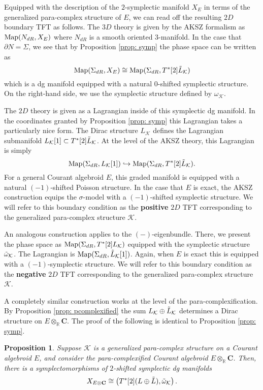 \documentclass[letterpaper,12pt]{article}
\newcommand{\KK}{\mathcal{K}}
\newcommand{\Cc}{\mathbf{C}}
\newcommand{\RR}{\mathbb{R}}
\newtheorem{proposition}[theorem]{Proposition}
\theoremstyle{definition}
\theoremstyle{remark}
\theoremstyle{examples}
\begin{document}
Equipped with the description of the $2$-symplectic manifold $X_E$ in terms of the generalized para-complex structure of $E$, we can read off the resulting $2D$ boundary TFT as follows.
The $3D$ theory is given by the AKSZ formalism as ${\rm Map}(N_{dR}, X_E)$ where $N_{dR}$ is a smooth oriented $3$-manifold.
In the case that $\partial N = \Sigma$, we see that by Proposition \ref{prop: symp} the phase space can be written as
\[
{\rm Map}(\Sigma_{dR} , X_E) \cong {\rm Map}(\Sigma_{dR}, T^*[2] \Tilde{L}_{\KK}) 
\]
which is a dg manifold equipped with a natural $0$-shifted symplectic structure.
On the right-hand side, we use the symplectic structure defined by $\omega_{\KK}$. 

The $2D$ theory is given as a Lagrangian inside of this symplectic dg manifold. 
In the coordinates granted by Proposition \ref{prop: symp} this Lagrangian takes a particularly nice form.
The Dirac structure $L_\KK$ defines the Lagrangian submanifold $L_\KK[1] \subset T^*[2] \Tilde{L}_{\KK}$. 
At the level of the AKSZ theory, this Lagrangian is simply
\[
{\rm Map}(\Sigma_{dR}, L_{\KK} [1])  \hookrightarrow {\rm Map}(\Sigma_{dR} , T^*[2] \Tilde{L}_{\KK}) .
\]
For a general Courant algebroid $E$, this graded manifold is equipped with a natural $(-1)$-shifted Poisson structure. 
In the case that $E$ is exact, the AKSZ construction equips the $\sigma$-model with a $(-1)$-shifted symplectic structure. 
We will refer to this boundary condition as the {\bf positive} $2D$ TFT corresponding to the generalized para-complex structure $\KK$. 

An analogous construction applies to the $(-)$-eigenbundle.
There, we present the phase space as ${\rm Map}(\Sigma_{dR}, T^*[2] L_{\KK})$ equipped with the symplectic structure $\Tilde{\omega}_{\KK}$. 
The Lagrangian is ${\rm Map}(\Sigma_{dR}, \Tilde{L}_{\KK} [1])$. 
Again, when $E$ is exact this is equipped with a $(-1)$-symplectic structure. 
We will refer to this boundary condition as the {\bf negative} $2D$ TFT corresponding to the generalized para-complex structure $\KK$. 

A completely similar construction works at the level of the para-complexification. 
By Proposition \ref{prop: pcomplexified} the sum $L_\KK \oplus \Tilde{L}_{\KK}$ determines a Dirac structure on $E \otimes_\RR \Cc$. 
The proof of the following is identical to Proposition \ref{prop: symp}. 

\begin{proposition}\label{prop: complexifiedsymp}
Suppose $\KK$ is a generalized para-complex structure on a Courant algebroid $E$, and consider the para-complexified Courant algebroid $E \otimes_{\RR} \Cc$. 
Then, there is a symplectomorphisms of $2$-shifted symplectic dg manifolds
\[
X_{E\otimes \Cc} \cong \left(T^*[2] (L \oplus \Tilde{L}), \Tilde{\omega}_{\KK} \right) .
\]
\end{proposition}
\end{document}
